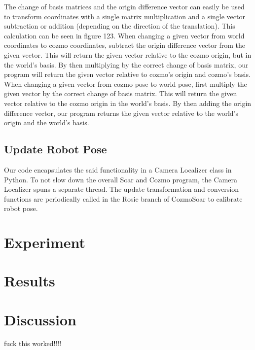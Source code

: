 \documentclass[jou,apacite]{apa6}
\begin{document}
The change of basis matrices and the origin difference vector can easily be used to transform coordinates with a single matrix multiplication and a single vector subtraction or addition (depending on the direction of the translation). This calculation can be seen in figure 123. When changing a given vector from world coordinates to cozmo coordinates, subtract the origin difference vector from the given vector. This will return the given vector relative to the cozmo origin, but in the world’s basis. By then multiplying by the correct change of basis matrix, our program will return the given vector relative to cozmo’s origin and cozmo’s basis. When changing a given vector from cozmo pose to world pose, first multiply the given vector by the correct change of basis matrix. This will return the given vector relative to the cozmo origin in the world’s basis. By then adding the origin difference vector, our program returns the given vector relative to the world’s origin and the world’s basis.

\subsection{Update Robot Pose}
Our code encapsulates the said functionality in a Camera Localizer class in Python. To not slow down the overall Soar and Cozmo program, the Camera Localizer spuns a separate thread. The update transformation and conversion functions are periodically called in the Rosie branch of CozmoSoar to calibrate robot pose. 

\section{Experiment}


\section{Results}


\section{Discussion}
fuck this worked!!!!\cite{Einstein}

\end{document}
